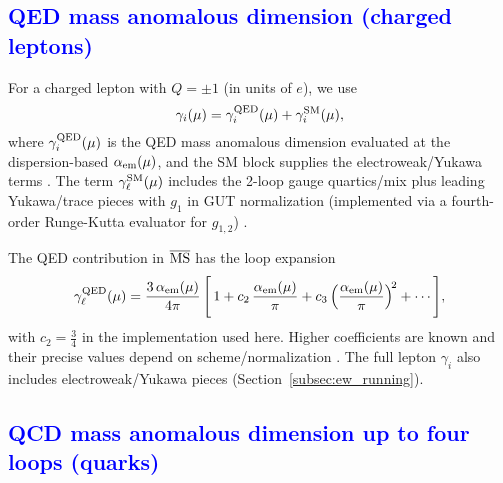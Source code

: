 \documentclass[%
amsmath,amssymb,
aps,
prb,
floatfix,showkeys
]{revtex4-2}
\newcommand{\modif}[1]{\textcolor{blue}{#1}}
\begin{document}
{\modif{\subsection{QED mass anomalous dimension (charged leptons)}  
\label{subsec:qed_ad}}}

For a charged lepton with $Q=\pm 1$ (in units of $e$), we use
\begin{equation}
  \gamma_i(\mu) = \gamma^{\rm QED}_i(\mu) + \gamma^{\rm SM}_i(\mu),
\end{equation}
where $\gamma^{\rm QED}_i(\mu)$ is the QED mass anomalous dimension evaluated at the dispersion-based $\alpha_{\rm em}(\mu)$, and the SM block supplies the electroweak/Yukawa terms \cite{Tarrach1981}. The term $\gamma^{\rm SM}_\ell(\mu)$ includes the 2-loop gauge quartics/mix plus leading Yukawa/trace pieces with $g_1$ in GUT normalization (implemented via a fourth-order Runge-Kutta evaluator for $g_{1,2}$) \cite{MachacekVaughn1983-85,Buttazzo2013}.
  
The QED contribution in $\overline{\rm MS}$ has the loop expansion
\begin{equation}
  \gamma_{\ell}^{\rm QED}(\mu) = \frac{3\,\alpha_{\rm em}(\mu)}{4\pi}\,\Bigg[\,1 +
  c_2\,\frac{\alpha_{\rm em}(\mu)}{\pi} + c_3\,\Big(\frac{\alpha_{\rm em}(\mu)}{\pi}\Big)^{\!2} + \cdots\Bigg],
  \label{eq:qed_gamma_series}
\end{equation}
with $c_2=\tfrac{3}{4}$ in the implementation used here. Higher coefficients are known and their precise values depend on scheme/normalization \cite{ChetyrkinKuehnSteinhauser2000,HerrenSteinhauser2018}. The full lepton $\gamma_i$ also includes electroweak/Yukawa pieces (Section~\ref{subsec:ew_running}).

{\modif{\subsection{QCD mass anomalous dimension up to four loops (quarks)}   
\label{subsec:qcd_ad}}}
\end{document}
